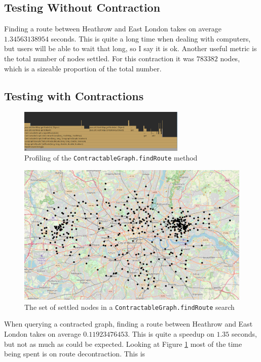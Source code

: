 \documentclass[11pt,twoside,a4paper]{report}
\begin{document}
\subsection{Testing Without Contraction}
Finding a route between Heathrow and East London takes on average $1.34563138954$ seconds. This is quite a long time when dealing with computers, but users will be able to wait that long, so I say it is ok.
Another useful metric is the total number of nodes settled. For this contraction it was $783382$ nodes, which is a sizeable proportion of the total number.
\subsection{Testing with Contractions}
\begin{figure}[t]
    \begin{center}
\includegraphics[width=8cm]{profiling.png}
    \end{center}
    \caption{Profiling of the \texttt{ContractableGraph.findRoute} method}
    \label{profiling}
\end{figure}
\begin{figure}[t]
    \begin{center}
        \includegraphics[width=12cm]{settled.png}
    \end{center}
    \caption{The set of settled nodes in a \texttt{ContractableGraph.findRoute} search}
    \label{settled}
\end{figure}
When querying a contracted graph, finding a route between Heathrow and East London takes on average $0.11923476453$. This is quite a speedup on $1.35$ seconds, but not as much as could be expected. Looking at Figure \ref{profiling} most of the time being spent is on route decontraction. This is
\end{document}
